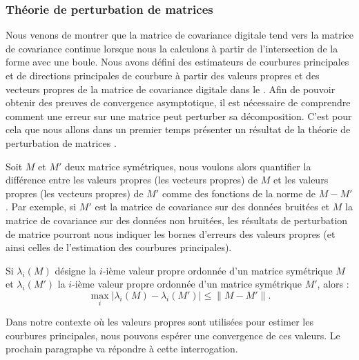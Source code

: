 \subsubsection{Théorie de perturbation de matrices}
%
Nous venons de montrer que la matrice de covariance digitale tend vers la
matrice de covariance continue lorsque nous la calculons à partir de
l'intersection de la forme avec une boule. Nous avons défini des estimateurs de
courbures principales et de directions principales de courbure à partir des
valeurs propres et des vecteurs propres de la matrice de covariance digitale
dans le . Afin de pouvoir obtenir des
preuves de convergence asymptotique, il est nécessaire de comprendre comment une
erreur sur une matrice peut perturber sa décomposition. C'est pour cela que nous
allons dans un premier temps présenter un résultat de la théorie de perturbation
de matrices \cite{Bauer1960,Stewart1990,Bhatia1997}.


Soit $M$ et $M'$ deux matrice symétriques, nous voulons alors quantifier la
différence entre les valeurs propres (\respp les vecteurs propres) de $M$ et les
valeurs propres (\resp les vecteurs propres) de $M'$ comme des fonctions de la
norme de $M - M'$. Par exemple, si $M'$ est la matrice de covariance sur des
données bruitées et $M$ la matrice de covariance sur des données non bruitées,
les résultats de perturbation de matrice pourront nous indiquer les bornes
d'erreurs des valeurs propres (et ainsi celles de l'estimation des courbures
principales).
%
\begin{theorem}{}
  \label{thm:lidskii-weyl}
  Si $\lambda_i(M)$ désigne la $i$-ième valeur propre ordonnée d'un matrice
  symétrique $M$ et $\lambda_i(M')$ la $i$-ième valeur propre ordonnée d'un matrice
  symétrique $M'$, alors :
  \begin{equation}
    \max_{i}| \lambda_i(M) - \lambda_i(M')| \le \|M-M'\| .
  \end{equation}
\end{theorem}
%
Dans notre contexte où les valeurs propres sont utilisées pour estimer les
courbures principales, nous pouvons espérer une convergence de ces valeurs. Le
prochain paragraphe va répondre à cette interrogation.
%
